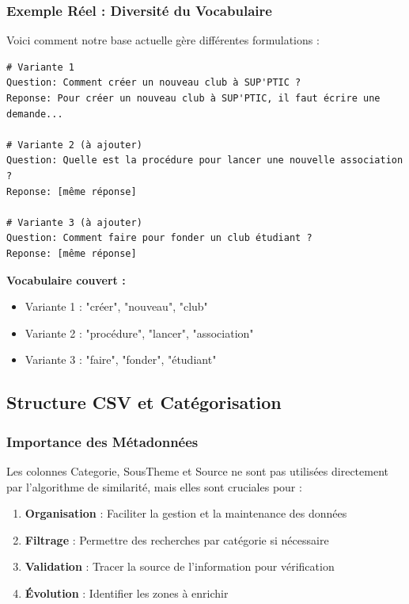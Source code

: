 \documentclass[11pt,a4paper]{article}
\begin{document}
\subsubsection{Exemple Réel : Diversité du Vocabulaire}

Voici comment notre base actuelle gère différentes formulations :

\begin{lstlisting}[caption=Variantes dans notre base]
# Variante 1
Question: Comment créer un nouveau club à SUP'PTIC ?
Reponse: Pour créer un nouveau club à SUP'PTIC, il faut écrire une demande...

# Variante 2 (à ajouter)
Question: Quelle est la procédure pour lancer une nouvelle association ?
Reponse: [même réponse]

# Variante 3 (à ajouter)
Question: Comment faire pour fonder un club étudiant ?
Reponse: [même réponse]
\end{lstlisting}

\textbf{Vocabulaire couvert :}
\begin{itemize}
    \item Variante 1 : "créer", "nouveau", "club"
    \item Variante 2 : "procédure", "lancer", "association"
    \item Variante 3 : "faire", "fonder", "étudiant"
\end{itemize}

\subsection{Structure CSV et Catégorisation}

\subsubsection{Importance des Métadonnées}

Les colonnes Categorie, SousTheme et Source ne sont pas utilisées directement par l'algorithme de similarité, mais elles sont cruciales pour :

\begin{enumerate}
    \item \textbf{Organisation} : Faciliter la gestion et la maintenance des données
    \item \textbf{Filtrage} : Permettre des recherches par catégorie si nécessaire
    \item \textbf{Validation} : Tracer la source de l'information pour vérification
    \item \textbf{Évolution} : Identifier les zones à enrichir
\end{enumerate}
\end{document}
